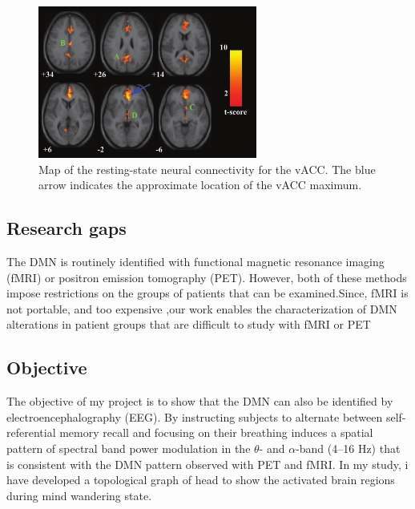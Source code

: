 \begin{figure}
    \centering
    \includegraphics[height=5cm]{Pictures/fmri1.png}
    \caption{Map of the resting-state neural connectivity for the vACC. The blue arrow indicates the approximate location of the vACC maximum.}
    \label{fig6}
\end{figure}

\subsection{Research gaps}
    The DMN is routinely identified with functional magnetic resonance imaging (fMRI) or positron emission tomography (PET). However, both of these methods impose restrictions on the groups of patients that can be examined.Since, fMRI is not portable, and too expensive ,our work enables the characterization of DMN alterations in patient groups that are difficult to study with fMRI or PET

\subsection{Objective}
    The objective of my project is to show that the DMN can also be identified by electroencephalography (EEG). By instructing subjects to alternate between self-referential memory recall and focusing on their breathing induces a spatial pattern of spectral band power modulation in the $\theta$- and $\alpha$-band (4–16 Hz) that is consistent with the DMN pattern observed with PET and fMRI.
    In my study, i have developed a topological graph of head to show the activated brain regions during mind wandering state. 

